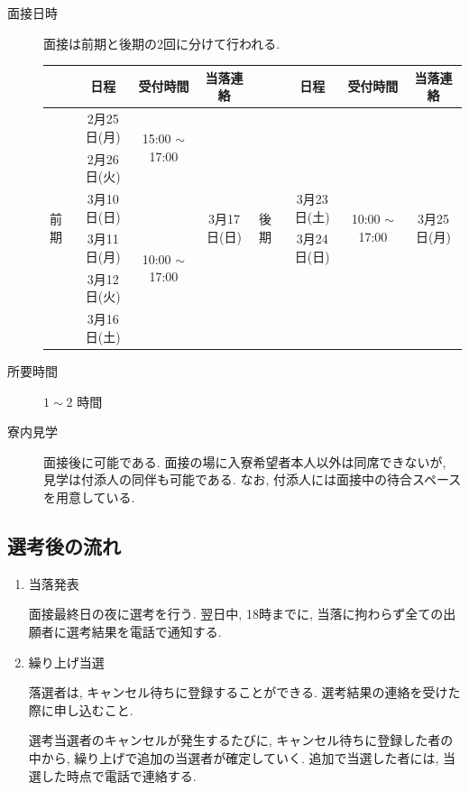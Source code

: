 \documentclass[10pt,b5jsbook,dvips,dvipdfmx,openany]{jsbook}
\theoremstyle{definition}
\begin{document}
		\begin{description}
		\item[面接日時] 面接は前期と後期の2回に分けて行われる. %

\begin{table}[htb]
  \begin{tabular}{|l|c|c|c||l|c|c|c|} \hline
    		& 日程 & 受付時間  & 当落連絡 &	& 日程 & 受付時間 & 当落連絡 \\ \hline \hline
    \multirow{6}{*}{前期}
      		& 2月25日(月)& \multirow{2}{*}{15:00 $ \sim $ 17:00 }& \multirow{6}{*}{3月17日(日)} &\multirow{6}{*}{後期} & &  \multirow{6}{*}{10:00 $ \sim $ 17:00} & \multirow{6}{*}{3月25日(月)} \\
    		& 2月26日(火)&  & & & & &\\ \cline{2-3}
      		& 3月10日(日)&  \multirow{4}{*}{10:00 $ \sim $ 17:00}& & & 3月23日(土) & &\\
    	  	& 3月11日(月)& & & & 3月24日(日)& &\\
      		& 3月12日(火)& & & & & &\\
     		& 3月16日(土)& & & & & &\\ \hline
  \end{tabular}
\end{table}


		\item[所要時間] $1 \sim 2 $ 時間
		\item[寮内見学] 面接後に可能である. 面接の場に入寮希望者本人以外は同席できないが, 見学は付添人の同伴も可能である. なお, 付添人には面接中の待合スペースを用意している.
		\end{description}

		\subsection{選考後の流れ}
		\begin{enumerate}
		\item 当落発表

		面接最終日の夜に選考を行う. 翌日中, 18時までに, 当落に拘わらず全ての出願者に選考結果を電話で通知する.
		\item 繰り上げ当選

 		落選者は, キャンセル待ちに登録することができる. 選考結果の連絡を受けた際に申し込むこと.

 		選考当選者のキャンセルが発生するたびに, キャンセル待ちに登録した者の中から, 繰り上げで追加の当選者が確定していく. 追加で当選した者には, 当選した時点で電話で連絡する.
		\end{enumerate}
\end{document}
